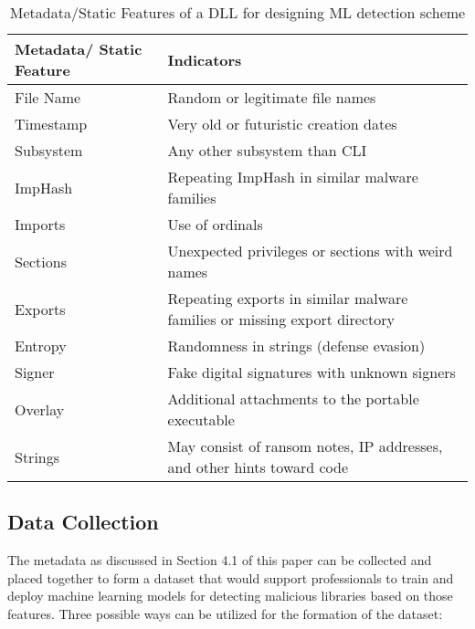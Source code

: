 \documentclass{article}
\begin{document}
\begin{table}[htbp]
    \centering
    \caption{Metadata/Static Features of a DLL for designing ML detection scheme}
    \label{tab:metadata_features}
    \begin{tabular}{|l|p{6cm}|}
        \hline
        \textbf{Metadata/ Static Feature} & \textbf{Indicators} \\
        \hline
        File Name & Random or legitimate file names \\
        \hline
        Timestamp & Very old or futuristic creation dates \\
        \hline
        Subsystem & Any other subsystem than CLI \\
        \hline
        ImpHash & Repeating ImpHash in similar malware families \\
        \hline
        Imports & Use of ordinals \\
        \hline
        Sections & Unexpected privileges or sections with weird names \\
        \hline
        Exports & Repeating exports in similar malware families or missing export directory \\
        \hline
        Entropy & Randomness in strings (defense evasion) \\
        \hline
        Signer & Fake digital signatures with unknown signers \\
        \hline
        Overlay & Additional attachments to the portable executable \\
        \hline
        Strings & May consist of ransom notes, IP addresses, and other hints toward code \\
        \hline
    \end{tabular}
\end{table}

\subsection{Data Collection}

The metadata as discussed in Section 4.1 of this paper can be collected and placed together to form a dataset that would support professionals to train and deploy machine learning models for detecting malicious libraries based on those features. Three possible ways can be utilized for the formation of the dataset:
\end{document}
